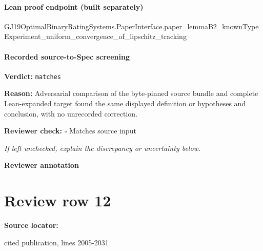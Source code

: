 \documentclass[10pt]{article}
\newcommand{\reviewerbox}{%
  \par\noindent\fbox{\parbox{0.96\linewidth}{\rule{0pt}{0.38in}}}\par
}
\newcommand{\reviewmatch}[1]{%
  \par\noindent\textbf{Reviewer check:} $\square$\; #1\par
  \noindent\emph{If left unchecked, explain the discrepancy or uncertainty below.}\par
}
\begin{document}
\paragraph{Lean proof endpoint (built separately)}\begin{ReviewVerbatim}
GJ19OptimalBinaryRatingSystems.PaperInterface.paper_lemmaB2_knownTypeExperiment_uniform_convergence_of_lipschitz_tracking
\end{ReviewVerbatim}

\paragraph{Recorded source-to-Spec screening}
\textbf{Verdict:} \texttt{matches}
\\
{\raggedright
\textbf{Reason:} Adversarial comparison of the byte-\allowbreak{}pinned source bundle and complete Lean-\allowbreak{}expanded target found the same displayed definition or hypotheses and conclusion, with no unrecorded correction.\allowbreak{}
\par}
\reviewmatch{Matches source input}
\noindent\textbf{Reviewer annotation}\par
\reviewerbox
\clearpage
\hypertarget{source-claim-76b42fc11ca5198e}{}
\section*{Review row 12}
\textbf{Source locator:} {\footnotesize\raggedright cited publication, lines 2005-\allowbreak{}2031\par}
\end{document}
